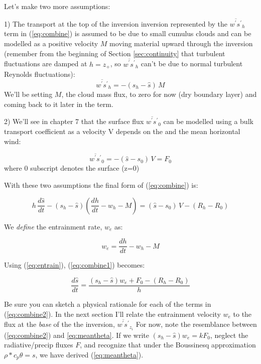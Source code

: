 \documentclass[12pt]{article}
\begin{document}
Let's make two more assumptions:


1) The transport at the top of the inversion inversion represented by the 
$\overline{w^\prime s^\prime}_h$ term in (\ref{eq:combine}) is assumed to be due to
small cumulus clouds and can be modelled as a positive velocity $M$ moving material
upward through the inversion (remember from the beginning of Section \ref{sec:continuity} that
turbulent fluctuations are damped at $h=z_+$, so $\overline{w^\prime s^\prime}_h$ can't be 
due to normal turbulent Reynolds fluctuations):
\begin{equation}
  \label{eq:cumulus}
  \overline{w^\prime s^\prime}_h = -(s_h - \hat{s} )\,M
\end{equation}
We'll be setting $M$, the cloud mass flux, to zero for now (dry boundary layer)
and coming back to it later in the term.


2) We'll see in chapter 7 that the surface flux $\overline{w^\prime s^\prime}_0$ can be modelled 
using a bulk transport coefficient as a velocity V depends on the
and the mean horizontal  wind:

\begin{equation}
  \label{eq:surface}
  \overline{w^\prime s^\prime}_0 = -(\hat{s} - s_0 )\,V = F_0
\end{equation}
where $0$ subscript denotes the surface (z=0)

With these two assumptions the final form of (\ref{eq:combine}) is:

\begin{equation}
  \label{eq:combine1}
  h \,\frac{d \hat{s}}{dt} - (s_h - \hat{s} )
\left (\frac{dh}{dt} - w_h - M \right ) =  (\hat{s} - s_0 )\,V - ( R_h  - R_0 )
\end{equation}

We \textit{define} the entrainment rate, $w_e$ as:

\begin{equation}
  \label{eq:entrain}
  w_e = \frac{dh}{dt} - w_h - M
\end{equation}

Using (\ref{eq:entrain}), (\ref{eq:combine1}) becomes:


\begin{equation}
  \label{eq:combine2}
 \frac{d \hat{s}}{dt} = \frac{ (s_h - \hat{s} )w_e + F_0 - ( R_h  - R_0 )}{h}
\end{equation}

Be sure you can sketch a physical rationale for each of the terms in (\ref{eq:combine2}).
In the next section I'll relate the entrainment velocity $w_e$ to the flux at the
\textit{base} of the the inversion, $\overline{w^\prime s^\prime}_{z_i}$  For now, note the resemblance between
(\ref{eq:combine2}) and \ref{eq:meantheta}.  If we write $(s_h - \hat{s} )w_e = k F_0$,
neglect the radiative/precip fluxes $F$, and recognize that under the Boussinesq
approximation $\rho* c_p \theta = s$,  we have derived (\ref{eq:meantheta}).
\end{document}
